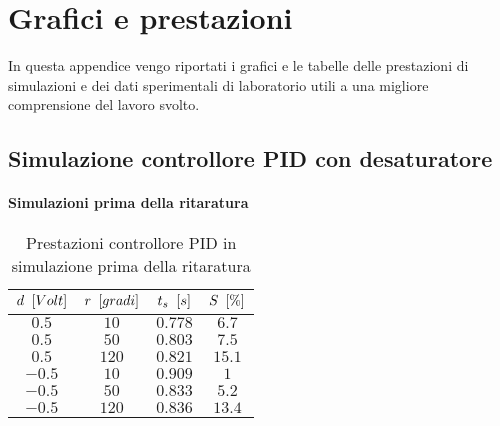 \section{Grafici e prestazioni}
\label{app:grafici}

	In questa appendice vengo riportati i grafici e le tabelle delle prestazioni di simulazioni e dei dati sperimentali di laboratorio utili a una migliore comprensione del lavoro svolto.
	
	\subsection{Simulazione controllore PID con desaturatore}
	\label{subapp:PIDsimulazione}
	
		\paragraph{Simulazioni prima della ritaratura}
		
			\begin{center}
				 
			\end{center}	
			
			\begin{center}
				 
			\end{center}
			
			\begin{table}[H]
				\centering
				\begin{tabular}{cccc}
					\toprule
					\textbf{$d \singleSpacing [Volt]$} & \textbf{$r \singleSpacing [gradi]$} & \textbf{$t_s \singleSpacing [s]$} & \textbf{$S \singleSpacing [\%]$}\\
					\midrule
					$0.5$   & $10$  & $0.778$ & $6.7$    \\
					$0.5$   & $50$  & $0.803$ & $7.5$    \\
					$0.5$   & $120$ & $0.821$ & $15.1$   \\
					$-0.5$  & $10$  & $0.909$ & $1$      \\
					$-0.5$  & $50$  & $0.833$ & $5.2$    \\ 	
					$-0.5$  & $120$ & $0.836$ & $13.4$   \\ 
					\bottomrule
				\end{tabular}
				\caption{Prestazioni controllore PID in simulazione prima della ritaratura}
				\label{tab:PIDsim}
			\end{table}		
		
